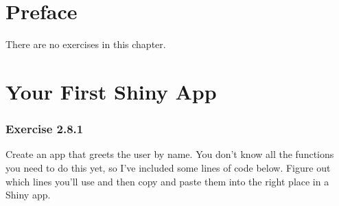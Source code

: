 \documentclass[]{book}
\newenvironment{Shaded}{\begin{snugshade}}{\end{snugshade}}
\newcommand{\DataTypeTok}[1]{\textcolor[rgb]{0.13,0.29,0.53}{#1}}
\newcommand{\DecValTok}[1]{\textcolor[rgb]{0.00,0.00,0.81}{#1}}
\newcommand{\KeywordTok}[1]{\textcolor[rgb]{0.13,0.29,0.53}{\textbf{#1}}}
\newcommand{\NormalTok}[1]{#1}
\newcommand{\OperatorTok}[1]{\textcolor[rgb]{0.81,0.36,0.00}{\textbf{#1}}}
\newcommand{\StringTok}[1]{\textcolor[rgb]{0.31,0.60,0.02}{#1}}
\begin{document}
\hypertarget{preface}{%
\chapter{Preface}\label{preface}}

There are no exercises in this chapter.

\hypertarget{your-first-shiny-app}{%
\chapter{Your First Shiny App}\label{your-first-shiny-app}}

\hypertarget{exercise-2.8.1}{%
\subsection*{Exercise 2.8.1}\label{exercise-2.8.1}}

Create an app that greets the user by name. You don't know all the functions
you need to do this yet, so I've included some lines of code below. Figure out
which lines you'll use and then copy and paste them into the right place in a
Shiny app.

\begin{Shaded}
\end{Shaded}
\end{document}
